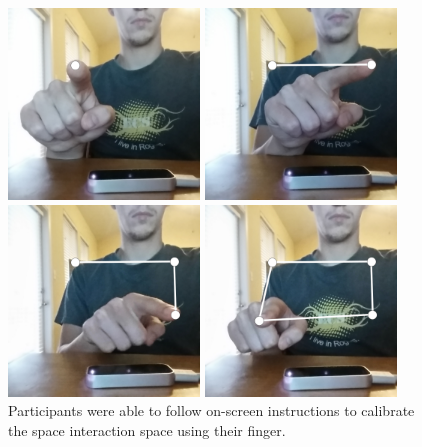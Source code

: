 \begin{figure}[h]
	\centering
	\begin{minipage}[t]{4in}
		\begin{minipage}[t]{1.9in}
			\includegraphics[width=2in]{fig_calib_1}
		\end{minipage}
		\begin{minipage}[t]{1.9in}
			\includegraphics[width=2in]{fig_calib_2}
		\end{minipage}
	\end{minipage}
	
	\begin{minipage}[t]{4in}
		\begin{minipage}[t]{1.9in}
			\includegraphics[width=2in]{fig_calib_3}
		\end{minipage}
		\begin{minipage}[t]{1.9in}
			\includegraphics[width=2in]{fig_calib_4}
		\end{minipage}
	\end{minipage}
	\caption[Calibration]{Participants were able to follow on-screen instructions to calibrate the space interaction space using their finger.}
	\label{calibration_in_progress}
\end{figure}

